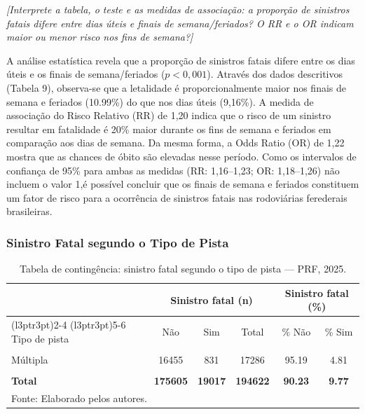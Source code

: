 \documentclass[
  brazilian,
  12pt,
]{article}
\begin{document}
\emph{{[}Interprete a tabela, o teste e as medidas de associação: a
proporção de sinistros fatais difere entre dias úteis e finais de
semana/feriados? O RR e o OR indicam maior ou menor risco nos fins de
semana?{]}}

A análise estatística revela que a proporção de sinistros fatais difere
entre os dias úteis e os finais de semana/feriados (\(p < 0,001\)).
Através dos dados descritivos (Tabela 9), observa-se que a letalidade é
proporcionalmente maior nos finais de semana e feriados (10.99\%) do que
nos dias úteis (9,16\%). A medida de associação do Risco Relativo (RR)
de 1,20 indica que o risco de um sinistro resultar em fatalidade é 20\%
maior durante os fins de semana e feriados em comparação aos dias de
semana. Da mesma forma, a Odds Ratio (OR) de 1,22 mostra que as chances
de óbito são elevadas nesse período. Como os intervalos de confiança de
95\% para ambas as medidas (RR: 1,16--1,23; OR: 1,18--1,26) não incluem
o valor 1,é possível concluir que os finais de semana e feriados
constituem um fator de risco para a ocorrência de sinistros fatais nas
rodoviárias ferederais brasileiras.

\subsubsection{Sinistro Fatal segundo o Tipo de
Pista}\label{sinistro-fatal-segundo-o-tipo-de-pista}

\begingroup\fontsize{11}{13}\selectfont

\begin{longtable}[t]{lccccc}
\caption{\label{tab:tab10}Tabela de contingência: sinistro fatal segundo o tipo de pista — PRF, 2025.}\\
\toprule
\multicolumn{1}{c}{ } & \multicolumn{3}{c}{Sinistro fatal (n)} & \multicolumn{2}{c}{Sinistro fatal (\%)} \\
\cmidrule(l{3pt}r{3pt}){2-4} \cmidrule(l{3pt}r{3pt}){5-6}
Tipo de pista & Não & Sim & Total & \% Não & \% Sim\\
\midrule
\cellcolor{gray!10}{Dupla} & \cellcolor{gray!10}{72395} & \cellcolor{gray!10}{4850} & \cellcolor{gray!10}{77245} & \cellcolor{gray!10}{93.72} & \cellcolor{gray!10}{6.28}\\
Múltipla & 16455 & 831 & 17286 & 95.19 & 4.81\\
\cellcolor{gray!10}{Simples} & \cellcolor{gray!10}{86755} & \cellcolor{gray!10}{13336} & \cellcolor{gray!10}{100091} & \cellcolor{gray!10}{86.68} & \cellcolor{gray!10}{13.32}\\
\textbf{Total} & \textbf{175605} & \textbf{19017} & \textbf{194622} & \textbf{90.23} & \textbf{9.77}\\
\bottomrule
\multicolumn{6}{l}{\rule{0pt}{1em}Fonte: Elaborado pelos autores.}\\
\end{longtable}
\endgroup{}
\end{document}
